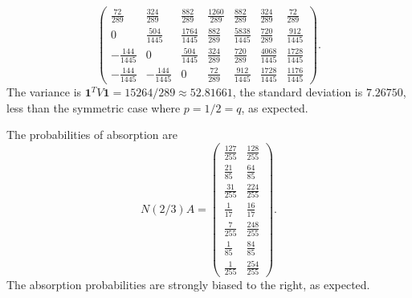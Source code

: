 \documentclass[12pt]{article}
\begin{document}
\begin{example}
\[\begin{pmatrix}
            \frac{72}{289} & \frac{324}{289} & \frac{882}{289} & \frac{1260}
            {289} & \frac{882}{289} & \frac{324}{289} & \frac{72}{289}\\
            0 & \frac{504}{1445} & \frac{1764}{1445} & \frac{882}{289} &
            \frac{5838}{1445} & \frac{720}{289} & \frac{912}{1445}\\
            -\frac{144}{1445} & 0 & \frac{504}{1445} & \frac{324}{289} &
            \frac{720}{289} & \frac{4068}{1445} & \frac{1728}{1445}\\
            -\frac{144}{1445} & -\frac{144}{1445} & 0 & \frac{72}{289} &
            \frac{912}{1445} & \frac{1728}{1445} & \frac{1176}{1445}
        \end{pmatrix}
        .
    \] The variance is \( \mathbf{1}^{T} V \mathbf{1} = 15264/289
    \approx 52.81661 \), the standard deviation is \( 7.26750 \), less
    than the symmetric case where \( p =1/2 = q \), as expected.

    The probabilities of absorption are
    \[
        N(2/3) A =
        \begin{pmatrix}
            \frac{127}{255} & \frac{128}{255} \\
            \frac{21}{85} & \frac{64}{85} \\
            \frac{31}{255} & \frac{224}{255} \\
            \frac{1}{17} & \frac{16}{17} \\
            \frac{7}{255} & \frac{248}{255} \\
            \frac{1}{85} & \frac{84}{85} \\
            \frac{1}{255} & \frac{254}{255}
        \end{pmatrix}
        .
    \] The absorption probabilities are strongly biased to the right, as
    expected.
\end{example}
\end{document}
